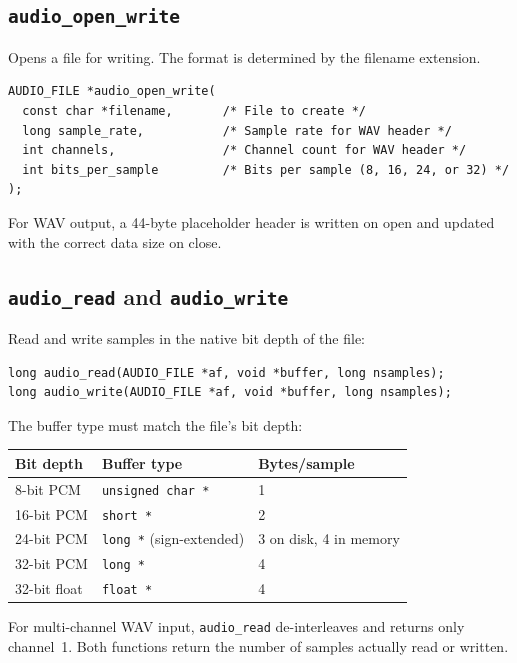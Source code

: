 \subsection{{\tt audio\_open\_write}}

Opens a file for writing. The format is determined by the filename extension.

{\small
\begin{verbatim}
AUDIO_FILE *audio_open_write(
  const char *filename,       /* File to create */
  long sample_rate,           /* Sample rate for WAV header */
  int channels,               /* Channel count for WAV header */
  int bits_per_sample         /* Bits per sample (8, 16, 24, or 32) */
);
\end{verbatim}
}

For WAV output, a 44-byte placeholder header is written on open and updated
with the correct data size on close.

\subsection{{\tt audio\_read} and {\tt audio\_write}}

Read and write samples in the native bit depth of the file:

{\small
\begin{verbatim}
long audio_read(AUDIO_FILE *af, void *buffer, long nsamples);
long audio_write(AUDIO_FILE *af, void *buffer, long nsamples);
\end{verbatim}
}

The buffer type must match the file's bit depth:

\begin{center}
\begin{tabular}{lll}
\hline
{\bf Bit depth} & {\bf Buffer type} & {\bf Bytes/sample} \\
\hline
8-bit PCM & {\tt unsigned char *} & 1 \\
16-bit PCM & {\tt short *} & 2 \\
24-bit PCM & {\tt long *} (sign-extended) & 3 on disk, 4 in memory \\
32-bit PCM & {\tt long *} & 4 \\
32-bit float & {\tt float *} & 4 \\
\hline
\end{tabular}
\end{center}

For multi-channel WAV input, {\tt audio\_read} de-interleaves and returns only
channel~1. Both functions return the number of samples actually read or
written.


